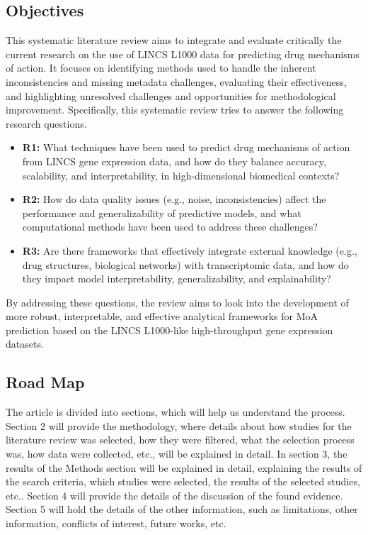 \documentclass[twocolumn]{article}
\begin{document}
\subsection{Objectives}
This systematic literature review aims to integrate and evaluate critically the current research on the use of LINCS L1000 data for predicting drug mechanisms of action. It focuses on identifying methods used to handle the inherent inconsistencies and missing metadata challenges, evaluating their effectiveness, and highlighting unresolved challenges and opportunities for methodological improvement. Specifically, this systematic review tries to answer the following research questions.
\begin{itemize}  
  \item \textbf{R1:} What techniques have been used to predict drug mechanisms of action from LINCS gene expression data, and how do they balance accuracy, scalability, and interpretability, in high-dimensional biomedical contexts?
  \item \textbf{R2:} How do data quality issues (e.g., noise, inconsistencies) affect the performance and generalizability of predictive models, and what computational methods have been used to address these challenges?
  \item \textbf{R3:} Are there frameworks that effectively integrate external knowledge (e.g., drug structures, biological networks) with transcriptomic data, and how do they impact model interpretability, generalizability, and explainability?
\end{itemize}
By addressing these questions, the review aims to look into the development of more robust, interpretable, and effective analytical frameworks for MoA prediction based on the LINCS L1000-like high-throughput gene expression datasets.

\subsection{Road Map}
The article is divided into sections, which will help us understand the process. Section 2 will provide the methodology, where details about how studies for the literature review was selected, how they were filtered, what the selection process was, how data were collected, etc., will be explained in detail. In section 3, the results of the Methods section will be explained in detail, explaining the results of the search criteria, which studies were selected, the results of the selected studies, etc.. Section 4 will provide the details of the discussion of the found evidence. Section 5 will hold the details of the other information, such as limitations, other information, conflicts of interest, future works, etc.
\end{document}
